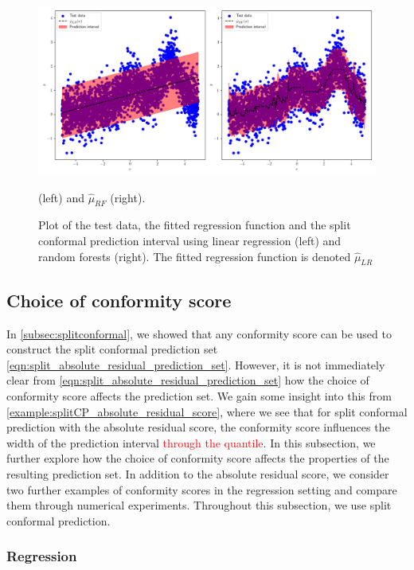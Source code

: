 \documentclass[11pt, titlepage]{article} %
\numberwithin{equation}{section}
\theoremstyle{definition}
\numberwithin{theorem}{section}
\numberwithin{lemma}{section}
\numberwithin{corollary}{section}
\numberwithin{proposition}{section}
\numberwithin{definition}{section}
\numberwithin{remark}{section}
\begin{document}
\begin{figure}[H]
    \centering
    \includegraphics[width=\linewidth]{figures/2_3_LR_RF_example.png}
    \caption{Plot of the test data, the fitted regression function and the split conformal prediction interval using linear regression (left) and random forests (right). The fitted regression function is denoted \(\hat{\mu}_{LR}\)} (left) and \(\hat{\mu}_{RF}\) (right). \label{fig:split_LR_RF}
\end{figure}

\subsection{Choice of conformity score}
\label{subsec:conformityscore}

In \cref{subsec:splitconformal}, we showed that any conformity score can be used to construct the split conformal prediction set \eqref{eqn:split_absolute_residual_prediction_set}. However, it is not immediately clear from \eqref{eqn:split_absolute_residual_prediction_set} how the choice of conformity score affects the prediction set. We gain some insight into this from \cref{example:splitCP_absolute_residual_score}, where we see that for split conformal prediction with the absolute residual score, the conformity score influences the width of the prediction interval \textcolor{red}{through the quantile}. In this subsection, we further explore how the choice of conformity score affects the properties of the resulting prediction set. In addition to the absolute residual score, we consider two further examples of conformity scores in the regression setting and compare them through numerical experiments. Throughout this subsection, we use split conformal prediction.

\subsubsection{Regression}
\end{document}

